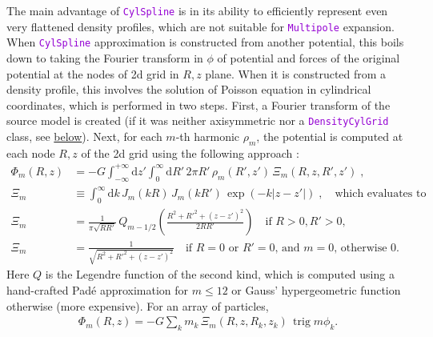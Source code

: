 \documentclass[12pt]{article}
\newcommand{\ttt}[1]{\textcolor{darkviolet}{\texttt{#1}}}
\renewcommand{\d}{\mathrm{d}}
\DeclareMathOperator{\trig}{trig}
\begin{document}
The main advantage of \ttt{CylSpline} is in its ability to efficiently represent even very flattened density profiles, which are not suitable for \ttt{Multipole} expansion. When \ttt{CylSpline} approximation is constructed from another potential, this boils down to taking the Fourier transform in $\phi$ of potential and forces of the original potential at the nodes of 2d grid in $R,z$ plane. When it is constructed from a density profile, this involves the solution of Poisson equation in cylindrical coordinates, which is performed in two steps. First, a Fourier transform of the source model is created (if it was neither axisymmetric nor a \ttt{DensityCylGrid} class, see \hyperref[sec:DensityCylGrid]{below}). Next, for each $m$-th harmonic $\rho_m$, the potential is computed at each node $R,z$ of the 2d grid using the following approach \cite{CohlTohline1999}:
\begin{align}
\Phi_m(R,z) &= -G \int_{-\infty}^{+\infty} \d z' \int_0^{\infty} \d R' \,2\pi R'\,\rho_m(R',z')  
  \,\Xi_m(R,z,R',z')\;,  \label{eq:PoissonCylindric} \\
\Xi_m &\equiv \int_0^\infty \d k\, J_m(kR)\, J_m(kR')\, \exp(-k|z-z'|) \;,\quad
  \mbox{which evaluates to} \\
\Xi_m&= \frac{1}{\pi\sqrt{RR'}}\, Q_{m-1/2}\left( \frac{R^2+R'^2+(z-z')^2}{2RR'} \right) \quad
  \mbox{if }R>0,R'>0,  \nonumber \\
\Xi_m&= \frac{1}{\sqrt{R^2+R'^2+(z-z')^2}}\quad
  \mbox{if }R=0\mbox{ or }R'=0\mbox{, and }m=0\mbox{, otherwise 0}. \nonumber
\end{align}
Here $Q$ is the Legendre function of the second kind, which is computed using a hand-crafted Pad\'e approximation for $m\le 12$ or Gauss' hypergeometric function otherwise (more expensive).
For an array of particles, 
\begin{align}  \label{eq:PoissonCylindricParticles}
\Phi_m(R,z) = -G \sum_k m_k\,\Xi_m(R,z,R_k,z_k)\,\trig m\phi_k .
\end{align}
\end{document}
